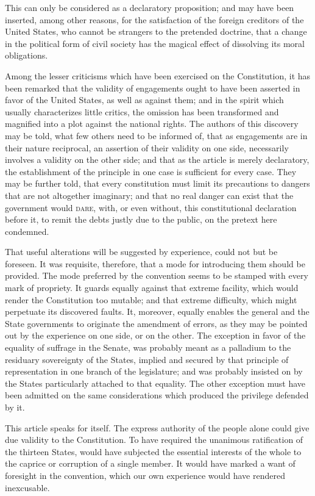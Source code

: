This can only be considered as a declaratory proposition; and may have been inserted, among other reasons, for the satisfaction of the foreign creditors of the United States, who cannot be strangers to the pretended doctrine, that a change in the political form of civil society has the magical effect of dissolving its moral obligations.

Among the lesser criticisms which have been exercised on the Constitution, it has been remarked that the validity of engagements ought to have been asserted in favor of the United States, as well as against them; and in the spirit which usually characterizes little critics, the omission has been transformed and magnified into a plot against the national rights. 
The authors of this discovery may be told, what few others need to be informed of, that as engagements are in their nature reciprocal, an assertion of their validity on one side, necessarily involves a validity on the other side; and that as the article is merely declaratory, the establishment of the principle in one case is sufficient for every case. 
They may be further told, that every constitution must limit its precautions to dangers that are not altogether imaginary; and that no real danger can exist that the government would \textsc{dare}, with, or even without, this constitutional declaration before it, to remit the debts justly due to the public, on the pretext here condemned.

That useful alterations will be suggested by experience, could not but be foreseen. 
It was requisite, therefore, that a mode for introducing them should be provided. 
The mode preferred by the convention seems to be stamped with every mark of propriety. 
It guards equally against that extreme facility, which would render the Constitution too mutable; and that extreme difficulty, which might perpetuate its discovered faults. 
It, moreover, equally enables the general and the State governments to originate the amendment of errors, as they may be pointed out by the experience on one side, or on the other. 
The exception in favor of the equality of suffrage in the Senate, was probably meant as a palladium to the residuary sovereignty of the States, implied and secured by that principle of representation in one branch of the legislature; and was probably insisted on by the States particularly attached to that equality. 
The other exception must have been admitted on the same considerations which produced the privilege defended by it.

This article speaks for itself. 
The express authority of the people alone could give due validity to the Constitution. 
To have required the unanimous ratification of the thirteen States, would have subjected the essential interests of the whole to the caprice or corruption of a single member. 
It would have marked a want of foresight in the convention, which our own experience would have rendered inexcusable.

